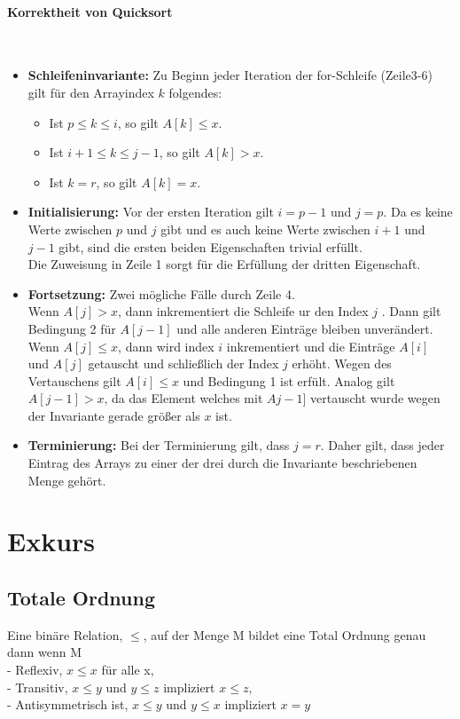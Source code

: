 	\paragraph{Korrektheit von Quicksort} \mbox{} \\
	\begin{itemize}
		\item \textbf{Schleifeninvariante:} Zu Beginn jeder Iteration der for-Schleife (Zeile3-6)
			gilt für den Arrayindex $k$ folgendes:
		\begin{itemize}
			\item Ist $p \leq k \leq i$, so gilt $A[k] \leq x$.
			\item Ist $i + 1 \leq k \leq j - 1$, so gilt $A[k] > x$.
			\item Ist $k = r $, so gilt $A[k] = x$.
		\end{itemize}
		\item \textbf{Initialisierung:} Vor der ersten Iteration gilt $i = p-1$ und $j = p$.
			Da es keine Werte zwischen $p$ und $j$ gibt und es auch keine Werte zwischen $i+1$ 
			und $j-1$ gibt, sind die ersten beiden Eigenschaften trivial erfüllt. \\
			Die Zuweisung in Zeile 1 sorgt für die Erfüllung der dritten Eigenschaft.
		\item \textbf{Fortsetzung:} Zwei mögliche Fälle durch Zeile 4. \\
			Wenn $A[j] > x$, dann inkrementiert die Schleife ur den Index $j$ . Dann gilt Bedingung 2
			für $A[j-1]$ und alle anderen Einträge bleiben unverändert. \\
			Wenn $A[j] \leq x$, dann wird index $i$ inkrementiert und die Einträge $A[i]$ und $A[j]$
			getauscht und schlie\ss lich der Index $j$ erhöht. Wegen des Vertauschens gilt 
			$A[i] \leq x$ und Bedingung 1 ist erfült. Analog gilt $A[j-1] > x$, da das Element welches
			mit $Aj-1]$ vertauscht wurde wegen der Invariante gerade grö\ss er als $x$ ist.
		\item \textbf{Terminierung:} Bei der Terminierung gilt, dass $j=r$. Daher gilt, dass
			jeder Eintrag des Arrays zu einer der drei durch die Invariante beschriebenen Menge gehört.
	\end{itemize}



\vspace{1.5cm}
\section{Exkurs} %

	\subsection{Totale Ordnung}
	Eine binäre Relation, $\leq$, auf der Menge M bildet eine Total Ordnung genau dann wenn M \\
	- Reflexiv, $x \leq x$ für alle x, \\
	- Transitiv, $x \leq y$ und $y \leq z$ impliziert $x \leq z$, \\
	- Antisymmetrisch ist, $x \leq y$ und $y \leq x$ impliziert $x = y$



\vspace{1.5cm}
 